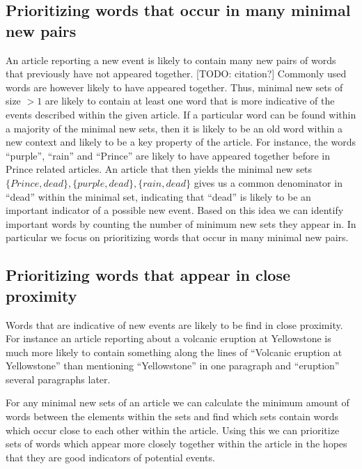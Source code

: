 \subsection{Prioritizing words that occur in many minimal new pairs}
An article reporting a new event is likely to contain many new pairs of words that previously have not appeared together. [TODO: citation?] Commonly used words are however likely to have appeared together. Thus, minimal new sets of size $>1$ are likely to contain at least one word that is more indicative of the events described within the given article. If a particular word can be found within a majority of the minimal new sets, then it is likely to be an old word within a new context and likely to be a key property of the article. For instance, the words ``purple'', ``rain'' and ``Prince'' are likely to have appeared together before in Prince related articles. An article that then yields the minimal new sets $\{Prince, dead\}, \{purple, dead\}, \{rain, dead\}$ gives us a  common denominator in ``dead'' within the minimal set, indicating that ``dead'' is likely to be an important indicator of a possible new event. Based on this idea we can identify important words by counting the number of minimum new sets they appear in. In particular we focus on prioritizing words that occur in many minimal new pairs.

\subsection{Prioritizing words that appear in close proximity}
Words that are indicative of new events are likely to be find in close proximity. For instance an article reporting about a volcanic eruption at Yellowstone is much more likely to contain something along the lines of ``Volcanic eruption at Yellowstone'' than mentioning ``Yellowstone'' in one paragraph and ``eruption'' several paragraphs later.

For any minimal new sets of an article we can calculate the minimum amount of words between the elements within the sets and find which sets contain words which occur close to each other within the article. Using this we can prioritize sets of words which appear more closely together within the article in the hopes that they are good indicators of potential events.

